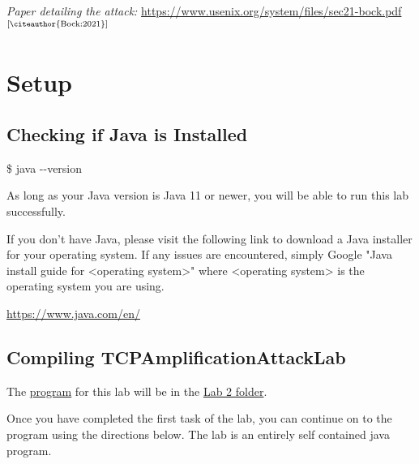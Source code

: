 \documentclass[letterpaper,12pt]{report}
\begin{document}
\textit{Paper detailing the attack:}
\url{https://www.usenix.org/system/files/sec21-bock.pdf} $^\text{[\citeauthor{Bock:2021}]}$


\section*{Setup}\label{sec:Setup}

\subsection*{Checking if Java is Installed}\label{sec:Checking-if-Java-is-Installed}

\bigskip

\begin{mdframed}[backgroundcolor=black!10,style=code,nobreak=true,align=center,userdefinedwidth=14cm]
    \$ java -{}-version
\end{mdframed}

As long as your Java version is Java 11 or newer, you will be able to run this lab successfully.

If you don't have Java, please visit the following link to download a Java installer for your operating system. If any issues are encountered, simply Google "Java install guide for <operating system>" where <operating system> is the operating system you are using.

\url{https://www.java.com/en/}

\subsection*{Compiling TCPAmplificationAttackLab}\label{sec:Compiling-TCPAmplificationAttackLab}

The \href{https://drive.google.com/file/d/14CoMaemmpK28jwWu3SaxBnkj2ScTdDmq/view?usp=drive_link}{program} for this lab will be in the \href{https://drive.google.com/drive/folders/1eKRoJG2hiRVtAQwjhZOw5exEAlkPk16H?usp=drive_link}{Lab 2 folder}.

Once you have completed the first task of the lab, you can continue on to the program using the directions below. The lab is an entirely self contained java program.
\end{document}
